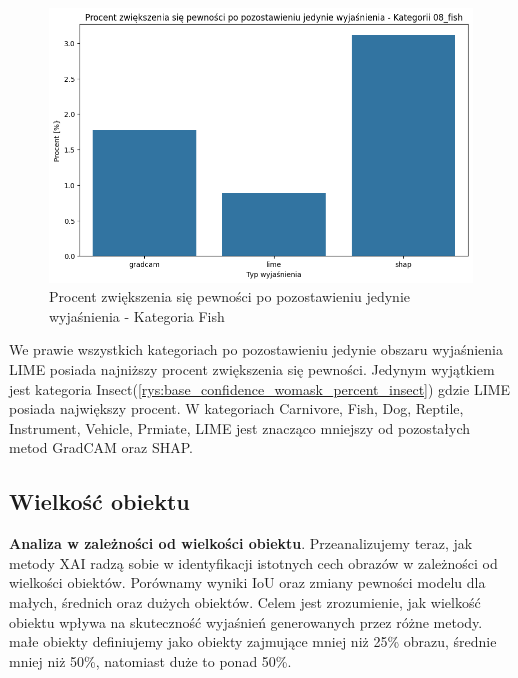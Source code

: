 \begin{figure}
\begin{minipage}[b]{0.3\textwidth}
		\centering\includegraphics[width=.9\textwidth]{img/base_confidence_womask_percent_fish}
		\caption{Procent zwiększenia się pewności po pozostawieniu jedynie wyjaśnienia - Kategoria Fish}  \label{rys:base_confidence_womask_percent_fish}
	\end{minipage}
\end{figure}

We prawie wszystkich kategoriach po pozostawieniu jedynie obszaru wyjaśnienia LIME posiada najniższy procent zwiększenia się pewności.
Jedynym wyjątkiem jest kategoria Insect(\ref{rys:base_confidence_womask_percent_insect}) gdzie LIME posiada największy procent.
W kategoriach Carnivore, Fish, Dog, Reptile, Instrument, Vehicle, Prmiate, LIME jest znacząco mniejszy od pozostałych metod GradCAM oraz SHAP.

\subsection*{Wielkość obiektu}

\textbf{Analiza w zależności od wielkości obiektu}.
Przeanalizujemy teraz, jak metody XAI radzą sobie w identyfikacji istotnych cech obrazów w zależności od wielkości obiektów.
Porównamy wyniki IoU oraz zmiany pewności modelu dla małych, średnich oraz dużych obiektów.
Celem jest zrozumienie, jak wielkość obiektu wpływa na skuteczność wyjaśnień generowanych przez różne metody.
małe obiekty definiujemy jako obiekty zajmujące mniej niż 25\% obrazu, średnie mniej niż 50\%, natomiast duże to ponad 50\%.

